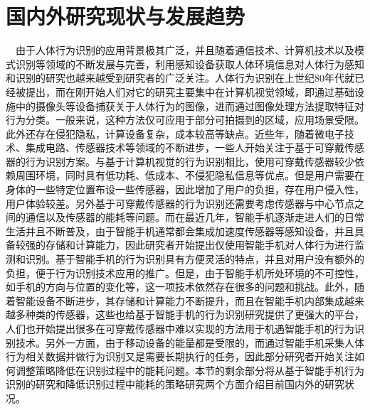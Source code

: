 \section{国内外研究现状与发展趋势}
\par　由于人体行为识别的应用背景极其广泛，并且随着通信技术、计算机技术以及模式识别等领域的不断发展与完善，利用感知设备获取人体环境信息对人体行为感知和识别的研究也越来越受到研究者的广泛关注。人体行为识别在上世纪80年代就已经被提出，而在刚开始人们对它的研究主要集中在计算机视觉领域，即通过基础设施中的摄像头等设备捕获关于人体行为的图像，进而通过图像处理方法提取特征对行为分类。一般来说，这种方法仅可应用于部分可拍摄到的区域\cite{oneSensorbased}，应用场景受限。此外还存在侵犯隐私，计算设备复杂，成本较高等缺点\cite{reviewOnSensorbased}。近些年，随着微电子技术、集成电路、传感器技术等领域的不断进步，一些人开始关注于基于可穿戴传感器的行为识别方案\cite{surveyOnSensorBased}。与基于计算机视觉的行为识别相比，使用可穿戴传感器较少依赖周围环境，同时具有低功耗、低成本、不侵犯隐私信息等优点。但是用户需要在身体的一些特定位置布设一些传感器，因此增加了用户的负担，存在用户侵入性，用户体验较差。另外基于可穿戴传感器的行为识别还需要考虑传感器与中心节点之间的通信以及传感器的能耗等问题。而在最近几年，智能手机逐渐走进人们的日常生活并且不断普及，由于智能手机通常都会集成加速度传感器等感知设备，并且具备较强的存储和计算能力\cite{surveyOnMobileSensing}，因此研究者开始提出仅使用智能手机对人体行为进行监测和识别。基于智能手机的行为识别具有方便灵活的特点，并且对用户没有额外的负担，便于行为识别技术应用的推广。但是，由于智能手机所处环境的不可控性，如手机的方向与位置的变化等，这一项技术依然存在很多的问题和挑战。此外，随着智能设备不断进步，其存储和计算能力不断提升，而且在智能手机内部集成越来越多种类的传感器，这些也给基于智能手机的行为识别研究提供了更强大的平台，人们也开始提出很多在可穿戴传感器中难以实现的方法用于机遇智能手机的行为识别技术。另外一方面，由于移动设备的能量都是受限的，而通过智能手机采集人体行为相关数据并做行为识别又是需要长期执行的任务，因此部分研究者开始关注如何调整策略降低在识别过程中的能耗问题。本节的剩余部分将从基于智能手机行为识别的研究和降低识别过程中能耗的策略研究两个方面介绍目前国内外的研究状况。

